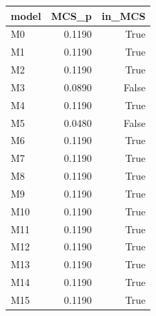 \begin{tabular}{lrr}
\toprule
model & MCS_p & in_MCS \\
\midrule
M0 & 0.1190 & True \\
M1 & 0.1190 & True \\
M2 & 0.1190 & True \\
M3 & 0.0890 & False \\
M4 & 0.1190 & True \\
M5 & 0.0480 & False \\
M6 & 0.1190 & True \\
M7 & 0.1190 & True \\
M8 & 0.1190 & True \\
M9 & 0.1190 & True \\
M10 & 0.1190 & True \\
M11 & 0.1190 & True \\
M12 & 0.1190 & True \\
M13 & 0.1190 & True \\
M14 & 0.1190 & True \\
M15 & 0.1190 & True \\
\bottomrule
\end{tabular}
